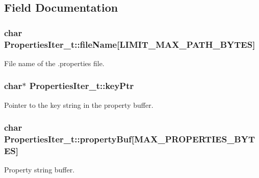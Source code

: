 \subsection{Field Documentation}
\subsubsection[{\texorpdfstring{file\+Name}{fileName}}]{\setlength{\rightskip}{0pt plus 5cm}char Properties\+Iter\+\_\+t\+::file\+Name\mbox{[}{\bf L\+I\+M\+I\+T\+\_\+\+M\+A\+X\+\_\+\+P\+A\+T\+H\+\_\+\+B\+Y\+T\+ES}\mbox{]}}\hypertarget{struct_properties_iter__t_a0511af8cd9557130b0376dff8395c4ba}{}\label{struct_properties_iter__t_a0511af8cd9557130b0376dff8395c4ba}


File name of the .properties file. 

\subsubsection[{\texorpdfstring{key\+Ptr}{keyPtr}}]{\setlength{\rightskip}{0pt plus 5cm}char$\ast$ Properties\+Iter\+\_\+t\+::key\+Ptr}\hypertarget{struct_properties_iter__t_a7c6b1017f15b21d000ab9dd85befc433}{}\label{struct_properties_iter__t_a7c6b1017f15b21d000ab9dd85befc433}


Pointer to the key string in the property buffer. 

\subsubsection[{\texorpdfstring{property\+Buf}{propertyBuf}}]{\setlength{\rightskip}{0pt plus 5cm}char Properties\+Iter\+\_\+t\+::property\+Buf\mbox{[}{\bf M\+A\+X\+\_\+\+P\+R\+O\+P\+E\+R\+T\+I\+E\+S\+\_\+\+B\+Y\+T\+ES}\mbox{]}}\hypertarget{struct_properties_iter__t_acf14c3a5bb7a943b611c5c3cccc1369f}{}\label{struct_properties_iter__t_acf14c3a5bb7a943b611c5c3cccc1369f}


Property string buffer. 

